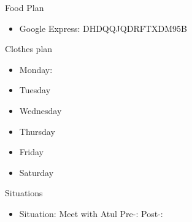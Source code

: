 \documentclass[serif, mathserif, final]{beamer}
\begin{document}
\begin{frame}
\begin{columns}
\begin{column}{0.25\linewidth}
  \begin{block}{Food Plan} 
    \begin{itemize}
      \tiny \item \tiny Google Express: DHDQQJQDRFTXDM95B
    \end{itemize}
  \end{block} 
  \begin{block}{Clothes plan} 
    \begin{itemize}
      \tiny \item \tiny Monday: 
    \item \tiny Tuesday
    \item \tiny Wednesday
    \item \tiny Thursday
    \item \tiny Friday
    \item \tiny Saturday
    \end{itemize} 
  \end{block}
  
  \begin{block}{Situations}
    \begin{itemize}
      \tiny \item \tiny Situation: Meet with Atul Pre-:  Post-:
    \end{itemize} 
  \end{block} 
  
\end{column} 
  \end{columns}
\end{frame}
\end{document}

